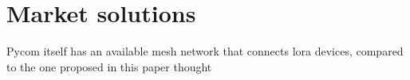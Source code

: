 		
	
	\section{Market solutions}
	
	
	
		Pycom itself has an available mesh network that connects lora devices, compared to the one proposed in this paper thought